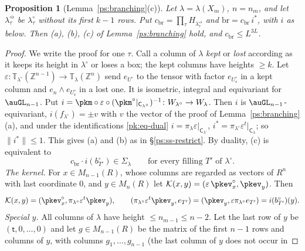 \documentclass[10pt]{amsart}
\newtheorem{proposition}[theorem]{Proposition}
\theoremstyle{definition}
\theoremstyle{remark}
\newcommand{\Z}{\mathbb Z}
\begin{document}
\begin{proposition}[Lemma~\ref{ps:branching}(c)]\label{pk:branching}
Let $\lambda=\lambda(X_m)$, $n=n_m$, and let $\lambda^{\circ\flat}_\tau$ be $\lambda^\circ_\tau$
without its first $k-1$ rows. Put $c_{\mathrm{br}}=\prod_\tau H_{\lambda^{\circ\flat}_\tau}$ and
$\mathrm{br}=c_{\mathrm{br}}\,i^*$, with $i$ as below. Then {\rm(a), (b), (c)} of
Lemma~\ref{ps:branching} hold, and $c_{\mathrm{br}}\le L^{3L}$.
\end{proposition}
\begin{proof}
We write the proof for one $\tau$. Call a column of $\lambda$ \emph{kept} or \emph{lost}
according as it keeps its height in $\lambda^\circ$ or loses a box; the kept columns have heights
$\ge k$. Let $\varepsilon\colon\mathbb T_{\lambda^\circ}(\Z^{n-1})\to\mathbb T_\lambda(\Z^n)$ send
$e_{U^\circ}$ to the tensor with factor $e_{U^\circ_{\mathfrak c}}$ in a kept column and
$e_n\wedge e_{U^\circ_{\mathfrak c}}$ in a lost one. It is isometric, integral and equivariant for
$\auGL_{n-1}$. Put $i=\pkm\circ\varepsilon\circ(\pkm^\circ|_{\mathsf C_{\lambda^\circ}})^{-1}\colon
W_{\lambda^\circ}\to W_\lambda$. Then $i$ is $\auGL_{n-1}$-equivariant, $i(f_{\lambda^\circ})=\pm v$
with $v$ the vector of the proof of Lemma~\ref{ps:branching}(a), and under the identifications
\eqref{pk:eq-dual} $i=\pi_\lambda\varepsilon|_{\mathsf C_{\lambda^\circ}}$, $i^*=\pi_{\lambda^\circ}
\varepsilon^t|_{\mathsf C_\lambda}$; so $\|i^*\|\le1$. This gives (a) and (b) as in
\S\ref{ps:ss-restrict}. By duality, (c) is equivalent to
\begin{equation}\label{pk:eq-c}
c_{\mathrm{br}}\cdot i(b^\circ_{T'})\in\Sigma_\lambda\qquad\text{for every filling }T'\text{ of }
\lambda^\circ .
\end{equation}
\emph{The kernel.} For $x\in M_{n-1}(R)$, whose columns are regarded as vectors of $R^n$ with last
coordinate $0$, and $y\in M_n(R)$ let $\mathcal K(x,y)=(\varepsilon\,\pkev^\circ_x,\pkev_y)$. Then
\begin{equation}\label{pk:eq-kernelbr}
\mathcal K(x,y)=(\pkev^\circ_x,\pi_{\lambda^\circ}\varepsilon^t\pkev_y),\qquad
(\pi_{\lambda^\circ}\varepsilon^t\pkev_y,e_{T'})=(\pkev_y,\varepsilon\pi_{\lambda^\circ}e_{T'})=
i(b^\circ_{T'})(y).
\end{equation}
\emph{Special $y$.} All columns of $\lambda$ have height $\le n_{m-1}\le n-2$. Let the last row
of $y$ be $(\mathsf t,0,\dots,0)$ and let $g\in M_{n-1}(R)$ be the matrix of the first $n-1$ rows
and columns of $y$, with columns $g_1,\dots,g_{n-1}$ (the last column of $y$ does not occur in

\end{proof}
\end{document}
